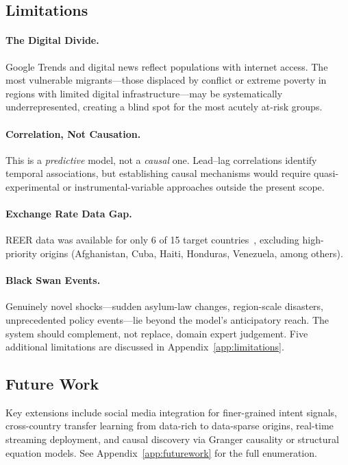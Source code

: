 \documentclass[11pt, a4paper]{article}
\begin{document}
\subsection{Limitations}

\paragraph{The Digital Divide.}
Google Trends and digital news reflect populations with internet access.
The most vulnerable migrants---those displaced by conflict or extreme poverty in regions
with limited digital infrastructure---may be systematically underrepresented, creating a
blind spot for the most acutely at-risk groups.

\paragraph{Correlation, Not Causation.}
This is a \textit{predictive} model, not a \textit{causal} one.  Lead--lag correlations
identify temporal associations, but establishing causal mechanisms would require
quasi-experimental or instrumental-variable approaches outside the present scope.

\paragraph{Exchange Rate Data Gap.}
REER data was available for only 6 of 15 target countries~\citep{imf_reer}, excluding
high-priority origins (Afghanistan, Cuba, Haiti, Honduras, Venezuela, among others).

\paragraph{Black Swan Events.}
Genuinely novel shocks---sudden asylum-law changes, region-scale disasters, unprecedented
policy events---lie beyond the model's anticipatory reach.  The system should complement,
not replace, domain expert judgement.  Five additional limitations are discussed in
Appendix~\ref{app:limitations}.\label{sec:limitations}


\subsection{Future Work}

Key extensions include social media integration for finer-grained intent signals,
cross-country transfer learning from data-rich to data-sparse origins, real-time
streaming deployment, and causal discovery via Granger causality or structural equation
models.  See Appendix~\ref{app:futurework} for the full enumeration.
\end{document}
